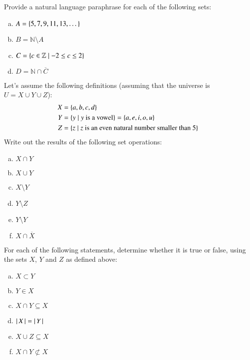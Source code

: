 \documentclass[nobib,nofonts]{tufte-handout}
\begin{document}
\bigskip
\noindent \colorbox{mygray}{\centering
  \begin{minipage}{1.0\textwidth}

    \begin{exercise}
      Provide a natural language paraphrase for each of the following sets:
      \begin{enumerate}[a.]
        \item $A = \left\{5, 7, 9, 11, 13, \dots\right\}$
        \item $B = \mathbb{N} \setminus A$
        \item $C = \left\{c \in \mathbb{Z} \mid -2 \le c \le 2\right\}$
        \item $D = \mathbb{N} \cap \overline{C}$
      \end{enumerate}
    \end{exercise}

    \begin{exercise}
      Let's assume the following definitions (assuming that the universe is $U = X \cup Y \cup Z$):
      \begin{align*}
        X & = \left\{a, b, c, d\right\} \\
        Y & = \left\{y \mid y \text{ is a vowel}\right\} = \left\{a, e, i, o, u\right\} \\
        Z & = \left\{z \mid z \text{ is an even natural number smaller than 5}\right\}
      \end{align*}
      Write out the results of the following set operations:
      \begin{multicols}{3}
      \begin{enumerate}[a.]
        \item $X \cap Y$
        \item $X \cup Y$
        \item $X \setminus Y$
        \item $Y \setminus Z$
        \item $Y \setminus Y$
        \item $X \cap \overline{X}$
      \end{enumerate}
    \end{multicols}
    \end{exercise}

    \begin{exercise}
      For each of the following statements, determine whether it is true or false, using the sets $X$, $Y$ and $Z$ as defined above:
      \begin{multicols}{3}
        \begin{enumerate}[a.]
          \item $X \subset Y$
          \item $Y \in X$
          \item $X \cap Y \subseteq X$
          \item $\left \lvert \, X \, \right\rvert = \left \lvert \, Y \, \right\rvert$
          \item $X \cup Z \subseteq X$
          \item $X \cap Y \not \subset X$
        \end{enumerate}
      \end{multicols}


\end{exercise}
\end{minipage}}
\end{document}
